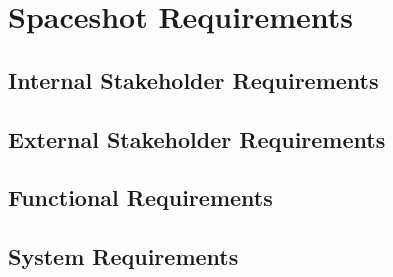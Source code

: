 \section{Spaceshot Requirements}
\subsection{Internal Stakeholder Requirements}
\subsection{External Stakeholder Requirements}
\subsection{Functional Requirements}
\subsection{System Requirements}